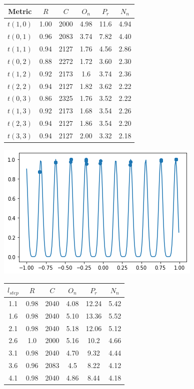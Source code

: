 \documentclass[smallextended]{svjour3}       %
\begin{document}
\begin{multicols}{2}
\begin{tabular}{cccccc}
	\toprule
    Metric & $R$ & $C$ & $O_{n}$ & $P_{r}$ & $N_{n}$\\
	\midrule
    $t(1,0)$ & 1.00 & 2000 & 4.98 & 11.6 & 4.94 \\
    $t(0,1)$ & 0.96 & 2083 & 3.74 & 7.82 & 4.40 \\
    $t(1,1)$ & 0.94 & 2127 & 1.76 & 4.56 & 2.86 \\
    $t(0,2)$ & 0.88 & 2272 & 1.72 & 3.60 & 2.30 \\
    $t(1,2)$ & 0.92 & 2173 & 1.6 & 3.74 & 2.36 \\
    $t(2,2)$ & 0.94 & 2127 & 1.82 & 3.62 & 2.22 \\
    $t(0,3)$ & 0.86 & 2325 & 1.76 & 3.52 & 2.22 \\
    $t(1,3)$ & 0.92 & 2173 & 1.68 & 3.54 & 2.26 \\
    $t(2,3)$ & 0.94 & 2127 & 1.86 & 3.54 & 2.20 \\
    $t(3,3)$ & 0.94 & 2127 & 2.00 & 3.32 & 2.18 \\
	\bottomrule
\end{tabular}


\begin{center}
  \includegraphics[width=\linewidth]{GA_images/example-cos-result.png}
\end{center}



\begin{tabular}{cccccc}
	\toprule
    $l_{step}$ & $R$ & $C$ & $O_{n}$ & $P_{r}$ & $N_{n}$\\
	\midrule
    1.1 & 0.98 & 2040 & 4.08 & 12.24 & 5.42 \\
    1.6 & 0.98 & 2040 & 5.10 & 13.36 & 5.52 \\
    2.1 & 0.98 & 2040 & 5.18 & 12.06 & 5.12 \\
    2.6 & 1.0  & 2000 & 5.16 & 10.2 & 4.66 \\
    3.1 & 0.98 & 2040 & 4.70 & 9.32 & 4.44 \\
    3.6 & 0.96 & 2083 & 4.5  & 8.22 & 4.12 \\
    4.1 & 0.98 & 2040 & 4.86 & 8.44 & 4.18 \\
	\bottomrule
\end{tabular}


\end{multicols}
\end{document}

